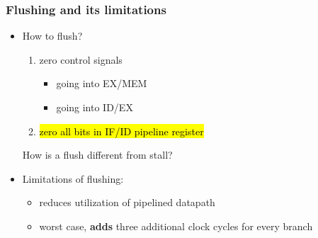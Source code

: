 \begin{frame}\frametitle{Flushing and its limitations}
\begin{itemize}
    \item How to flush?
\begin{enumerate}
    \item zero control signals
    \begin{itemize}
        \item going into EX/MEM
        \item going into ID/EX
    \end{itemize}
    
        \item \hl{zero all bits in IF/ID pipeline register}
    
\end{enumerate}
\begin{tcolorbox}[enhanced,attach boxed title to top center={yshift=-3mm,yshifttext=-1mm},
  colback=blue!5!white,colframe=blue!75!black,colbacktitle=blue!80!black,
  title=Think About It,fonttitle=\bfseries,
  boxed title style={size=small,colframe=red!50!black} ]
How is a flush different from stall?\\
\ifnum{}\fi
  \end{tcolorbox}
  \item Limitations of flushing:
  \begin{itemize}
      \item reduces utilization of pipelined datapath
      \item worst case, \textbf{adds} three additional clock cycles for every branch
  \end{itemize}
  \end{itemize}

\end{frame}


